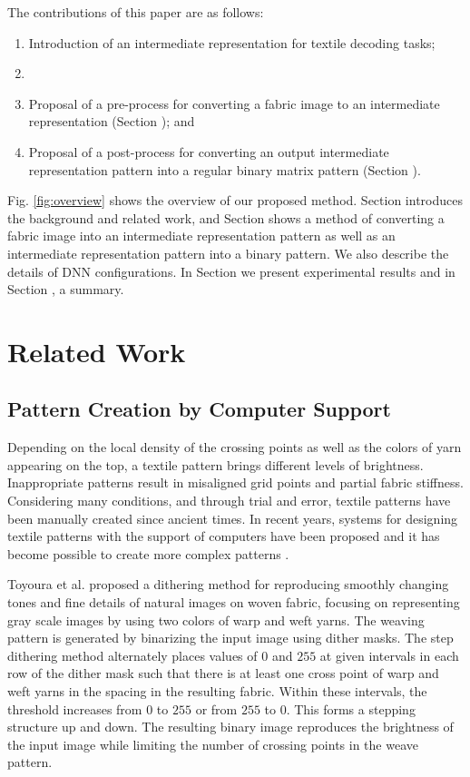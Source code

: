 The contributions of this paper are as follows: 

\begin{enumerate}
\item Introduction of an intermediate representation for textile decoding tasks;
\item {} 
\item Proposal of a pre-process for converting a fabric image to an intermediate representation (Section ); and
\item  Proposal of a post-process for converting an output intermediate representation pattern into a regular binary matrix pattern (Section ).
\end{enumerate}

Fig. \ref{fig:overview} shows the overview of our proposed method. Section  introduces the background and related work, and Section  shows a method of converting a fabric image into an intermediate representation pattern as well as an intermediate representation pattern into a binary pattern. We also describe the details of DNN configurations. In Section  we present experimental results and in Section , a summary. 

\section{Related Work}
\subsection{Pattern Creation by Computer Support}
Depending on the local density of the crossing points as well as the colors of yarn appearing on the top, a textile pattern brings different levels of brightness. Inappropriate patterns result in misaligned grid points and partial fabric stiffness. Considering many conditions, and through trial and error, textile patterns have been manually created since ancient times. In recent years, systems for designing textile patterns with the support of computers have been proposed and it has become possible to create more complex patterns \cite{Igarashi17,Ng14,Zhang18}. 

Toyoura et al. \cite{Toyoura19} proposed a dithering method for reproducing smoothly changing tones and fine details of natural images on woven fabric, focusing on representing gray scale images by using two colors of warp and weft yarns. The weaving pattern is generated by binarizing the input image using dither masks. The step dithering method alternately places values of $0$ and $255$ at given intervals in each row of the dither mask such that there is at least one cross point of warp and weft yarns in the spacing in the resulting fabric. Within these intervals, the threshold increases from $0$ to $255$ or from $255$ to $0$. This forms a stepping structure up and down. The resulting binary image reproduces the brightness of the input image while limiting the number of crossing points in the weave pattern. 

